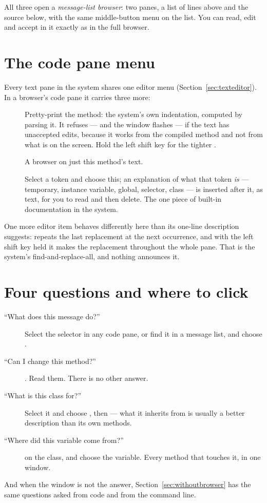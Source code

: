 All three open a \emph{message-list browser}: two panes, a list of
 lines above and the source below, with the same
middle-button menu on the list. You can read, edit and accept in it exactly as
in the full browser.

\section{The code pane menu}

Every text pane in the system shares one editor menu
(Section~\ref{sec:texteditor}). In a browser's code pane it carries three
more:

\begin{description}
\item[] Pretty-print the method: the system's own indentation,
  computed by parsing it. It refuses --- and the window flashes --- if the
  text has unaccepted edits, because it works from the compiled method and not
  from what is on the screen. Hold the left shift key for the tighter
  .
\item[] A browser on just this method's text.
\item[] Select a token and choose this; an explanation of what
  that token \emph{is} --- temporary, instance variable, global, selector,
  class --- is inserted after it, as text, for you to read and then delete.
  The one piece of built-in documentation in the system.
\end{description}

One more editor item behaves differently here than its one-line description
suggests:  repeats the last replacement at the next occurrence, and
with the left shift key held it makes the replacement throughout the whole
pane. That is the system's find-and-replace-all, and nothing announces it.

\section{Four questions and where to click}

\begin{description}
\item[``What does this message do?''] Select the selector in any code pane,
  or find it in a message list, and choose .
\item[``Can I change this method?''] . Read them. There is no
  other answer.
\item[``What is this class for?''] Select it and choose , then
   --- what it inherits from is usually a better description
  than its own methods.
\item[``Where did this variable come from?'']  on the
  class, and choose the variable. Every method that touches it, in one window.
\end{description}

And when the window is not the answer, Section~\ref{sec:withoutbrowser} has
the same questions asked from code and from the command line.
